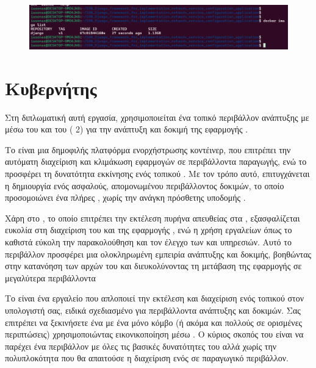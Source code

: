 \begin{figure}[h]
	\centering
	\includegraphics[width=1.5\textwidth]{graphics/docker_image_list.png}
	\caption{}
\end{figure}


\section{Κυβερνήτης}

Στη διπλωματική αυτή εργασία, χρησιμοποιείται ένα τοπικό περιβάλλον 
ανάπτυξης με  μέσω του  και του 
( 2) για την ανάπτυξη και δοκιμή 
της εφαρμογής . 

Το  είναι μια δημοφιλής 
πλατφόρμα ενορχήστρωσης κοντέινερ, που επιτρέπει την αυτόματη 
διαχείριση και κλιμάκωση εφαρμογών σε περιβάλλοντα παραγωγής, 
ενώ το  προσφέρει τη δυνατότητα εκκίνησης ενός 
τοπικού . 
Με τον τρόπο αυτό, επιτυγχάνεται η δημιουργία ενός ασφαλούς, 
απομονωμένου περιβάλλοντος δοκιμών, το οποίο προσομοιώνει ένα 
πλήρες , χωρίς την ανάγκη πρόσθετης υποδομής .

Χάρη στο , το οποίο επιτρέπει την εκτέλεση  
πυρήνα απευθείας στα , 
εξασφαλίζεται ευκολία στη διαχείριση του  
και της εφαρμογής , 
ενώ η χρήση εργαλείων όπως το  
καθιστά εύκολη την παρακολούθηση και τον έλεγχο των  
και υπηρεσιών. Αυτό το περιβάλλον προσφέρει μια ολοκληρωμένη 
εμπειρία ανάπτυξης και δοκιμής, βοηθώντας στην κατανόηση των 
αρχών του  και διευκολύνοντας τη μετάβαση της 
εφαρμογής σε μεγαλύτερα  περιβάλλοντα

Το  είναι ένα εργαλείο που απλοποιεί την εκτέλεση και 
διαχείριση ενός τοπικού  στον υπολογιστή σας,
ειδικά σχεδιασμένο για περιβάλλοντα ανάπτυξης και δοκιμών. 
Σας επιτρέπει να ξεκινήσετε ένα  
με ένα μόνο κόμβο (ή ακόμα και πολλούς σε ορισμένες περιπτώσεις) 
χρησιμοποιώντας εικονικοποίηση μέσω . 
Ο κύριος σκοπός του  είναι να παρέχει ένα περιβάλλον  
με όλες τις βασικές δυνατότητες του  
αλλά χωρίς την πολυπλοκότητα που θα απαιτούσε η διαχείριση ενός 
σε παραγωγικό περιβάλλον.

